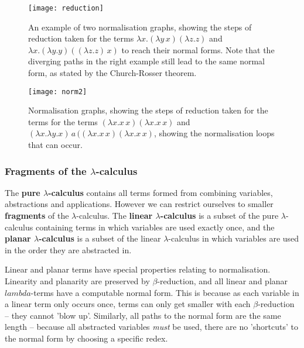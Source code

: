 \documentclass[11pt]{article}
\begin{document}
\begin{figure}
    \centering
    \texttt{[image: reduction]}
    \caption{An example of two normalisation graphs, showing the steps of reduction taken for the terms $\lambda x. (\lambda y \, x) (\lambda z. z)$ and $\lambda x. (\lambda y. y) ((\lambda z. z) \, x)$ to reach their normal forms. Note that the diverging paths in the right example still lead to the same normal form, as stated by the Church-Rosser theorem.}
    \label{fig:normgraphs}
\end{figure}

\begin{figure}
    \centering
    \texttt{[image: norm2]}
    \caption{Normalisation graphs, showing the steps of reduction taken for the terms for the terms $(\lambda x. x \, x)(\lambda x. x \, x)$ and $(\lambda x. \lambda y. x) \, a \, ((\lambda x. x \, x)(\lambda x. x \, x)$, showing the normalisation loops that can occur.}
    \label{fig:normgraphs2}
\end{figure}

\subsubsection{Fragments of the \texorpdfstring{$\lambda$}{lambda}-calculus}
The \textbf{pure $\lambda$-calculus} contains all terms formed from combining variables, abstractions and applications. However we can restrict ourselves to smaller \textbf{fragments} of the $\lambda$-calculus. The \textbf{linear $\lambda$-calculus} is a subset of the pure $\lambda$-calculus containing terms in which variables are used exactly once, and the \textbf{planar $\lambda$-calculus} is a subset of the linear $\lambda$-calculus in which variables are used in the order they are abstracted in. 

Linear and planar terms have special properties relating to normalisation. Linearity and planarity are preserved by $\beta$-reduction, and all linear and planar $lambda$-terms have a computable normal form. This is because as each variable in a linear term only occurs once, terms can only get smaller with each $\beta$-reduction -- they cannot 'blow up'. Similarly, all paths to the normal form are the same length -- because all abstracted variables \textit{must} be used, there are no 'shortcuts' to the normal form by choosing a specific redex. 
\end{document}

